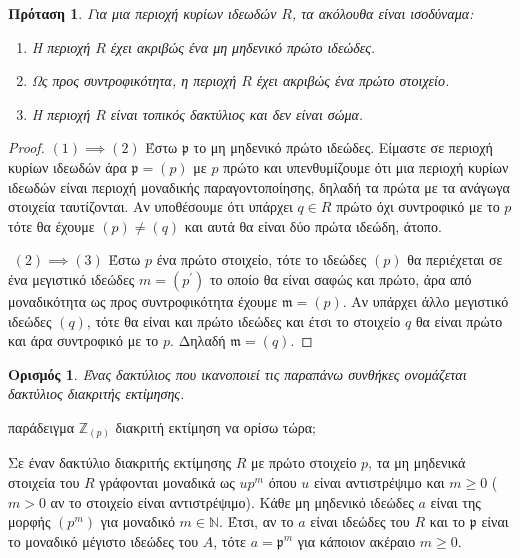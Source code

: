 \documentclass[oneside,a4paper]{article}
\newtheorem*{defn}{Ορισμός}
\newtheorem{prop}{Πρόταση}
\newcommand{\Z}{\mathbb{Z}}
\begin{document}
\pagebreak




\begin{prop} Για μια περιοχή κυρίων ιδεωδών $R$, τα ακόλουθα είναι ισοδύναμα:
	\begin{enumerate}
		\item Η περιοχή $R$ έχει ακριβώς ένα μη μηδενικό πρώτο ιδεώδες.
		\item Ως προς συντροφικότητα, η περιοχή $R$ έχει ακριβώς ένα πρώτο στοιχείο.
		\item Η περιοχή $R$ είναι τοπικός δακτύλιος και δεν είναι σώμα. 
	\end{enumerate}
\end{prop}

\begin{proof}  $(1) \implies (2)$ Έστω $\mathfrak{p}$ το μη μηδενικό πρώτο ιδεώδες. Είμαστε σε περιοχή κυρίων ιδεωδών άρα $\mathfrak{p} = (p)$ με $p$ πρώτο και υπενθυμίζουμε ότι μια περιοχή κυρίων ιδεωδών είναι περιοχή μοναδικής παραγοντοποίησης, δηλαδή τα πρώτα με τα ανάγωγα στοιχεία ταυτίζονται. Αν υποθέσουμε ότι υπάρχει $q \in R$ πρώτο όχι συντροφικό με το $p$ τότε θα έχουμε $(p) \neq (q)$ και αυτά θα είναι δύο πρώτα ιδεώδη, άτοπο.

	$ $\newline
	$(2) \implies (3)$ Έστω $p$ ένα πρώτο στοιχείο, τότε το ιδεώδες $(p)$ θα περιέχεται σε ένα μεγιστικό ιδεώδες $m = (p^{\prime})$ το οποίο θα είναι σαφώς και πρώτο, άρα από μοναδικότητα ως προς συντροφικότητα έχουμε $\mathfrak{m} = (p)$. Αν υπάρχει άλλο μεγιστικό ιδεώδες $(q)$, τότε θα είναι και πρώτο ιδεώδες και έτσι το στοιχείο $q$ θα είναι πρώτο και άρα συντροφικό με το $p$. Δηλαδή $\mathfrak{m} = (q)$. 
\end{proof}

\begin{defn}
	Ένας δακτύλιος που ικανοποιεί τις παραπάνω συνθήκες ονομάζεται δακτύλιος διακριτής εκτίμησης.
\end{defn}

παράδειγμα $\Z_{(p)}$
διακριτή εκτίμηση να ορίσω τώρα;


Σε έναν δακτύλιο διακριτής εκτίμησης $R$ με πρώτο στοιχείο $p$, τα μη μηδενικά στοιχεία του $R$ γράφονται μοναδικά ως $up^m$ όπου $u$ είναι αντιστρέψιμο και $m\geq 0$ ($m>0$ αν το στοιχείο είναι αντιστρέψιμο). Κάθε μη μηδενικό ιδεώδες $a$ είναι της μορφής $(p^m)$ για μοναδικό $m \in \mathbb{N}$. Έτσι, αν το $a$ είναι ιδεώδες του $R$ και το $\mathfrak{p}$ είναι το μοναδικό μέγιστο ιδεώδες του $A$, τότε $a = \mathfrak{p}^m$ για κάποιον ακέραιο $m\geq 0$.
\end{document}
